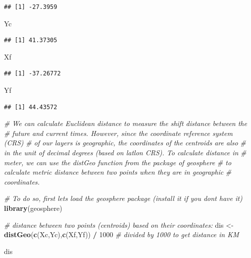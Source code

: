 \documentclass[
]{article}
\newenvironment{Shaded}{\begin{snugshade}}{\end{snugshade}}
\newcommand{\CommentTok}[1]{\textcolor[rgb]{0.56,0.35,0.01}{\textit{#1}}}
\newcommand{\DecValTok}[1]{\textcolor[rgb]{0.00,0.00,0.81}{#1}}
\newcommand{\FunctionTok}[1]{\textcolor[rgb]{0.13,0.29,0.53}{\textbf{#1}}}
\newcommand{\NormalTok}[1]{#1}
\newcommand{\OtherTok}[1]{\textcolor[rgb]{0.56,0.35,0.01}{#1}}
\newcommand{\SpecialCharTok}[1]{\textcolor[rgb]{0.81,0.36,0.00}{\textbf{#1}}}
\begin{document}
\begin{verbatim}
## [1] -27.3959
\end{verbatim}

\begin{Shaded}
\begin{Highlighting}[]
\NormalTok{Yc}
\end{Highlighting}
\end{Shaded}

\begin{verbatim}
## [1] 41.37305
\end{verbatim}

\begin{Shaded}
\begin{Highlighting}[]
\NormalTok{Xf}
\end{Highlighting}
\end{Shaded}

\begin{verbatim}
## [1] -37.26772
\end{verbatim}

\begin{Shaded}
\begin{Highlighting}[]
\NormalTok{Yf}
\end{Highlighting}
\end{Shaded}

\begin{verbatim}
## [1] 44.43572
\end{verbatim}

\begin{Shaded}
\begin{Highlighting}[]
\CommentTok{\# We can calculate Euclidean distance to measure the shift distance between the }
\CommentTok{\# future and  current times. However, since the coordinate reference system (CRS) }
\CommentTok{\# of our layers is geographic, the coordinates of the centroids are also }
\CommentTok{\# in the unit of decimal degrees (based on latlon CRS). To calculate distance in}
\CommentTok{\# meter, we can use the distGeo function from the package of geosphere }
\CommentTok{\# to calculate metric distance between two points when they are in geographic }
\CommentTok{\# coordinates.}

\CommentTok{\# To do so, first let\textquotesingle{}s load the geosphere package (install it if you don\textquotesingle{}t have it)}
\FunctionTok{library}\NormalTok{(geosphere)}

\CommentTok{\# distance between two points (centroids) based on their coordinates:}
\NormalTok{dis }\OtherTok{\textless{}{-}} \FunctionTok{distGeo}\NormalTok{(}\FunctionTok{c}\NormalTok{(Xc,Yc),}\FunctionTok{c}\NormalTok{(Xf,Yf)) }\SpecialCharTok{/} \DecValTok{1000} \CommentTok{\# divided by 1000 to get distance in KM}


\NormalTok{dis}
\end{Highlighting}
\end{Shaded}
\end{document}
